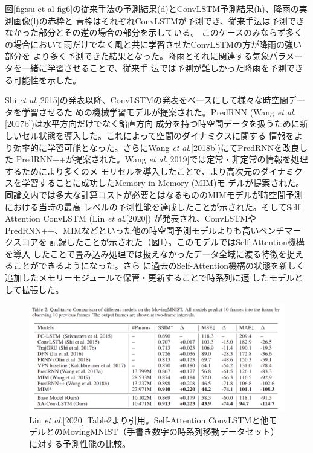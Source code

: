 図\ref{fig:su-et-al-fig6}の従来手法の予測結果(d)とConvLSTM予測結果(h)、降雨の実測画像(l)の赤枠と
青枠はそれぞれConvLSTMが予測でき、従来手法は予測できなかった部分とその逆の場合の部分を示している。
このケースのみならず多くの場合において雨だけでなく風と共に学習させたConvLSTMの方が降雨の強い部分を
より多く予測できた結果となった。降雨とそれに関連する気象パラメータを一緒に学習させることで、従来手
法では予測が難しかった降雨を予測できる可能性を示した。

Shi \textit{et al}.[2015]の発表以降、ConvLSTMの発表をベースにして様々な時空間データを学習させるた
めの機械学習モデルが提案された。PredRNN (Wang \textit{et al}.[2017b])は水平方向だけでなく鉛直方向
成分を持つ時空間データを扱うために新しいセル状態を導入した。これによって空間のダイナミクスに関する
情報をより効率的に学習可能となった。さらにWang \textit{et al}.[2018b])にてPredRNNを改良した
PredRNN++が提案された。Wang \textit{et al.}[2019]では定常・非定常の情報を処理するためにより多くのメ
モリセルを導入したことで、より高次元のダイナミクスを学習することに成功したMemory in Memory (MIM)モ
デルが提案された。同論文内では多大な計算コストが必要とはなるもののMIMモデルが時空間予測における当時の最高
レベルの予測性能を達成したことが示された。そしてSelf-Attention ConvLSTM (Lin \textit{et al}.[2020])
が発表され、ConvLSTMやPredRNN++、MIMなどといった他の時空間予測モデルよりも高いベンチマークスコアを
記録したことが示された（図\ref{fig:lin-et-al-movingmnist}）。このモデルではSelf-Attention機構を導入
したことで畳み込み処理では扱えなかったデータ全域に渡る特徴を捉えることができるようになった。さら
に過去のSelf-Attention機構の状態を新しく追加したメモリーモジュールで保管・更新することで時系列に適
したモデルとして拡張した。

\begin{figure}[H]
\begin{center}
\includegraphics[width=0.9\linewidth]{fig/intro/lin-et-al-movingmnist.png}
\captionsetup{width=0.9\linewidth}
\caption{Lin \textit{et al}.[2020] Table2より引用。Self-Attention ConvLSTMと他モデルとのMovingMNIST（手書き数字の時系列移動データセット）に対する予測性能の比較。}
\label{fig:lin-et-al-movingmnist}
\end{center}
\end{figure}

